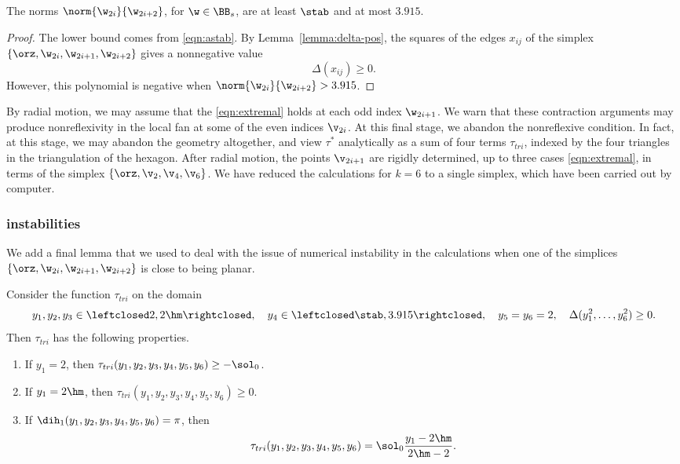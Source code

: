 \figARTLHOI %

\begin{lemma}
The norms $\norm{\w_{2i}}{\w_{2i+2}}$, for $\w\in \BB_s$, 
are at least $\stab$ and at most $3.915$.
\end{lemma}

\begin{proof}
  The lower bound comes from \eqref{eqn:astab}.  By
  Lemma~\ref{lemma:delta-pos}, the squares of the edges $x_{ij}$ of
  the simplex $\{\orz,\w_{2i},\w_{2i+1},\w_{2i+2}\}$ gives a
  nonnegative value
\[
\Delta(x_{ij})\ge 0.
\]
However, this polynomial is  negative when
$\norm{\w_{2i}}{\w_{2i+2}} > 3.915$.
\end{proof}

By radial motion, we may assume that the \eqref{eqn:extremal} holds at
each odd index $\w_{2i+1}$.  We warn that these contraction arguments
may produce nonreflexivity in the local fan at some of the even
indices $\v_{2i}$.  At this final stage, we abandon the nonreflexive
condition.  In fact, at this stage, we may abandon the geometry
altogether, and view $\tau^*$ analytically as a sum of four terms
$\tau_{tri}$, indexed by the four triangles in the triangulation of
the hexagon.  After radial motion, the points $\v_{2i+1}$ are rigidly
determined, up to three cases \eqref{eqn:extremal}, in terms of the
simplex $\{\orz,\v_2,\v_4,\v_6\}$.  We have reduced the calculations
for $k=6$ to a single simplex, which have been carried out by
computer.

\subsubsection{instabilities}

We add a final lemma that we used to deal with the issue of numerical
instability in the calculations when one of the simplices 
$\{\orz,\w_{2i},\w_{2i+1},\w_{2i+2}\}$ is close to being planar.

%
\begin{lemma}
Consider the function $\tau_{tri}$
on the domain
\[
y_1,y_2,y_3\in\leftclosed 2,2\hm\rightclosed,
\quad y_4\in\leftclosed \stab,3.915\rightclosed,
\quad y_5=y_6=2,\quad
\Delta(y_1^2,\ldots,y_6^2)\ge0.
\]
Then $\tau_{tri}$ has the following properties.
\begin{enumerate}
\item If $y_1=2$, then $\tau_{tri}(y_1,y_2,y_3,y_4,y_5,y_6)\ge -\sol_0$.
\item If $y_1=2\hm$, then $\tau_{tri}(y_1,y_2,y_3,y_4,y_5,y_6)\ge 0$.
\item If $\dih_1(y_1,y_2,y_3,y_4,y_5,y_6) =\pi$, then 
  \[
  \tau_{tri}(y_1,y_2,y_3,y_4,y_5,y_6) = \sol_0\dfrac{y_1 -2\hm}{2\hm-2}.
  \]
\end{enumerate}
\end{lemma}


